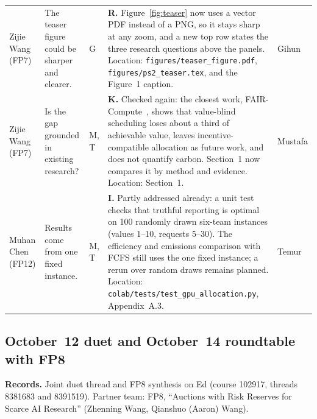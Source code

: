 {\begin{tabularx}{\textwidth}{@{}p{}p{}p{}Yp{0.065\textwidth}@{}}
Zijie Wang (FP7) & The teaser figure could be sharper and clearer. & G & \textbf{R.} Figure~\ref{fig:teaser} now uses a vector PDF instead of a PNG, so it stays sharp at any zoom, and a new top row states the three research questions above the panels. Location: \texttt{figures/teaser\_figure.pdf}, \texttt{figures/ps2\_teaser.tex}, and the Figure~1 caption. & Gihun \\
Zijie Wang (FP7) & Is the gap grounded in existing research? & M, T & \textbf{K.} Checked again: the closest work, FAIR-Compute~\cite{fair_compute2026}, shows that value-blind scheduling loses about a third of achievable value, leaves incentive-compatible allocation as future work, and does not quantify carbon. Section~1 now compares it by method and evidence. Location: Section~1. & Mustafa \\
Muhan Chen (FP12) & Results come from one fixed instance. & M, T & \textbf{I.} Partly addressed already: a unit test checks that truthful reporting is optimal on 100 randomly drawn six-team instances (values 1--10, requests 5--30). The efficiency and emissions comparison with FCFS still uses the one fixed instance; a rerun over random draws remains planned. Location: \texttt{colab/tests/test\_gpu\_allocation.py}, Appendix~A.3. & Temur \\
\bottomrule
\end{tabularx}}

\subsection{October~12 duet and October~14 roundtable with FP8}
\textbf{Records.} Joint duet thread and FP8 synthesis on Ed (course 102917, threads 8381683 and 8391519). Partner team: FP8, ``Auctions with Risk Reserves for Scarce AI Research'' (Zhenning Wang, Qianshuo (Aaron) Wang).

